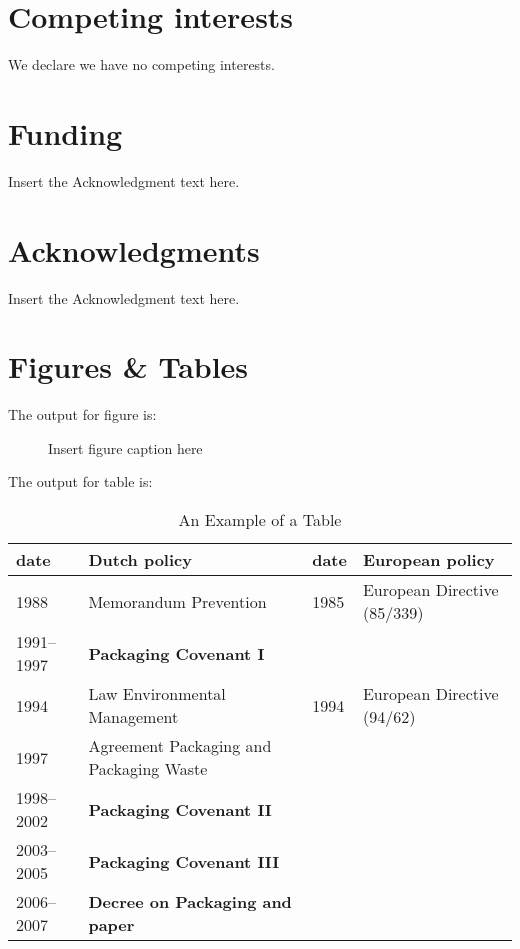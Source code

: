 \documentclass[]{rsos}%
\begin{document}
\section*{Competing interests}
We declare we have no competing interests.

\section*{Funding}
Insert the Acknowledgment text here.

\section*{Acknowledgments}
Insert the Acknowledgment text here.





\section*{Figures \& Tables}

The output for figure is:

\begin{figure}[!h]
\caption{Insert figure caption here}
\label{fig_sim}
\end{figure}

\vspace*{-10pt}

\noindent The output for table is:

\begin{table}[!h]
\caption{An Example of a Table}%
\label{table_example}
\begin{tabular}{llll}%
\hline
date &Dutch policy &date &European policy \\
\hline
1988 &Memorandum Prevention &1985 &European Directive (85/339) \\
1991--1997 &{\bf Packaging Covenant I} & & \\
1994 &Law Environmental Management &1994 &European Directive (94/62) \\
1997 &Agreement Packaging and Packaging Waste & & \\
1998--2002 &{\bf Packaging Covenant II} & & \\
2003--2005 &{\bf Packaging Covenant III} & & \\
2006--2007 &{\bf Decree on Packaging and paper} & & \\\hline
\end{tabular}
\end{table}%
\end{document}
